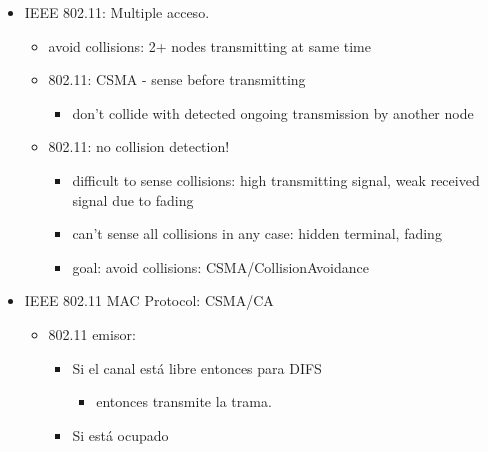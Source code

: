 \documentclass[12pt, twoside, openright]{report} %
\begin{document}
          \begin{itemize}
          \item
            IEEE 802.11: Multiple acceso.

            \begin{itemize}
              \item
              avoid collisions: 2+ nodes transmitting at same time
            \item
              802.11: CSMA - sense before transmitting

              \begin{itemize}
                  \item
                don't collide with detected ongoing transmission by
                another node
              \end{itemize}
            \item
              802.11: no collision detection!

              \begin{itemize}
                  \item
                difficult to sense collisions: high transmitting signal,
                weak received signal due to fading
              \item
                can't sense all collisions in any case: hidden terminal,
                fading
              \item
                goal: avoid collisions: CSMA/CollisionAvoidance
              \end{itemize}
            \end{itemize}
          \item
            IEEE 802.11 MAC Protocol: CSMA/CA

            \begin{itemize}
              \item
              802.11 emisor:

              \begin{itemize}
                  \item
                Si el canal está libre entonces para DIFS

                \begin{itemize}
                      \item
                  entonces transmite la trama.
                \end{itemize}
              \item
                Si está ocupado


\end{itemize}
\end{itemize}
\end{itemize}
\end{document}
